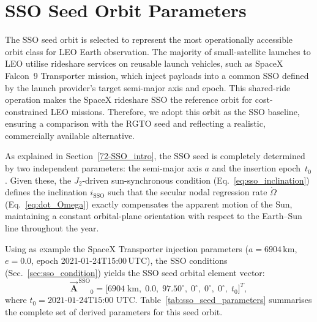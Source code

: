 \section{SSO Seed Orbit Parameters}
\label{sct-SSO_seed}

The SSO seed orbit is selected to represent the most operationally accessible orbit class for LEO Earth observation.  The majority of small-satellite launches to LEO utilise rideshare services on reusable launch vehicles, such as SpaceX Falcon~9 Transporter mission, which inject payloads into a common SSO defined by the launch provider's target semi-major axis and epoch.  This shared-ride operation makes the SpaceX rideshare SSO the reference orbit for cost-constrained LEO missions. Therefore, we adopt this orbit as the SSO baseline, ensuring a comparison with the RGTO seed and reflecting a realistic, commercially available alternative.

As explained in Section~\ref{72-SSO_intro}, the SSO seed is completely determined by two independent parameters: the semi-major axis $a$ and the insertion epoch~$t_0$.  Given these, the $J_2$-driven sun-synchronous condition (Eq.~\eqref{eq:sso_inclination}) defines the inclination $i_{\mathrm{SSO}}$ such that the secular nodal regression rate $\dot{\Omega}$ (Eq.~\eqref{eq:dot_Omega}) exactly compensates the apparent motion of the Sun, maintaining a constant orbital-plane orientation with respect to the Earth--Sun line throughout the year.

Using as example the SpaceX Transporter injection parameters ($a = 6904$\,km, $e = 0.0$, epoch 2021-01-24T15:00\,UTC), the SSO conditions  (Sec.~\ref{sec:sso_condition}) yields the SSO seed orbital element vector:
\begin{equation}
    \vec{\mathbf{A}}^{\,\mathrm{SSO}}{}_{0} = \bigl[6904\;\mathrm{km},\; 0.0,\; 97.50^{\circ},\; 0^{\circ},\; 0^{\circ},\; 0^{\circ},\; t_0\bigr]^{T},
    \label{eq:sso_seed_vector}
\end{equation}
where $t_0 = \text{2021-01-24T15:00 UTC}$.  Table~\ref{tab:sso_seed_parameters} summarises the complete set of derived parameters for this seed orbit.

